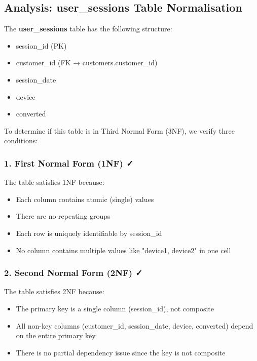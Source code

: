 \documentclass[12pt,a4paper]{article}
\begin{document}
\begin{tcolorbox}[
    colback=white,
    colframe=secondarygray,
    fonttitle=\bfseries,
    title=Option (b): Is the user\_sessions table in 3NF?,
    boxrule=0.5pt,
    arc=3pt,
    left=10pt,
    right=10pt,
    top=10pt,
    bottom=10pt
]

\subsection*{Analysis: user\_sessions Table Normalisation}

The \textbf{user\_sessions} table has the following structure:
\begin{itemize}[leftmargin=*,noitemsep,topsep=3pt]
    \item session\_id (PK)
    \item customer\_id (FK → customers.customer\_id)
    \item session\_date
    \item device
    \item converted
\end{itemize}

To determine if this table is in Third Normal Form (3NF), we verify three conditions:

\subsubsection*{1. First Normal Form (1NF) ✓}
The table satisfies 1NF because:
\begin{itemize}[leftmargin=*,noitemsep,topsep=2pt]
    \item Each column contains atomic (single) values
    \item There are no repeating groups
    \item Each row is uniquely identifiable by session\_id
    \item No column contains multiple values like "device1, device2" in one cell
\end{itemize}

\subsubsection*{2. Second Normal Form (2NF) ✓}
The table satisfies 2NF because:
\begin{itemize}[leftmargin=*,noitemsep,topsep=2pt]
    \item The primary key is a single column (session\_id), not composite
    \item All non-key columns (customer\_id, session\_date, device, converted) depend on the entire primary key
    \item There is no partial dependency issue since the key is not composite
\end{itemize}


\end{tcolorbox}
\end{document}

